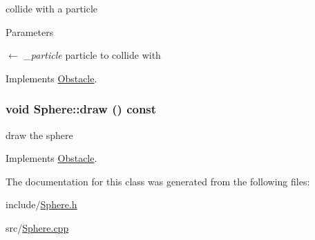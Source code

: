 collide with a particle 
\begin{DoxyParams}{Parameters}
\item[\mbox{$\leftarrow$} {\em \_\-particle}]particle to collide with \end{DoxyParams}


Implements \hyperlink{classObstacle_ae35a1937df593d5caf25c5545acbaffd}{Obstacle}.\hypertarget{classSphere_a75a92a2b70974147560dd8c0514b2652}{
\subsubsection[{draw}]{\setlength{\rightskip}{0pt plus 5cm}void Sphere::draw () const}}
\label{classSphere_a75a92a2b70974147560dd8c0514b2652}


draw the sphere 

Implements \hyperlink{classObstacle_a7476b22bcd25e3731a0ef2aa5324afa0}{Obstacle}.

The documentation for this class was generated from the following files:\begin{DoxyCompactItemize}
\item 
include/\hyperlink{Sphere_8h}{Sphere.h}\item 
src/\hyperlink{Sphere_8cpp}{Sphere.cpp}\end{DoxyCompactItemize}
